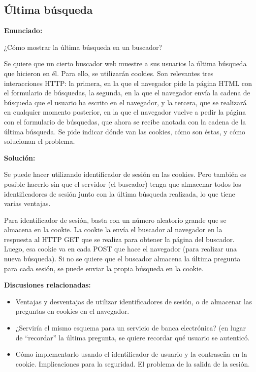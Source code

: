 \subsection{Última búsqueda}
\label{subsec:ultima-busqueda}

\textbf{Enunciado:}

¿Cómo mostrar la última búsqueda en un  buscador?

Se quiere que un cierto buscador web muestre a sus usuarios la última búsqueda que hicieron en él. Para ello, se utilizarán cookies. Son relevantes tres interacciones HTTP: la primera, en la que el navegador pide la página HTML con el formulario de búsquedas, la segunda, en la que el navegador envía la cadena de búsqueda que el usuario ha escrito en el navegador, y la tercera, que se realizará en cualquier momento posterior, en la que el navegador vuelve a pedir la página con el formulario de búsquedas, que ahora se recibe anotada con la cadena de la última búsqueda. Se pide indicar dónde van las cookies, cómo son éstas, y cómo solucionan el problema.

\textbf{Solución:}

Se puede hacer utilizando identificador de sesión en las cookies. Pero también es posible hacerlo sin que el servidor (el buscador) tenga que almacenar todos los identificadores de sesión  junto con la última búsqueda realizada, lo que tiene varias ventajas.

Para identificador de sesión, basta con un número aleatorio grande que se almacena en la cookie. La cookie la envía el buscador al navegador en la respuesta al HTTP GET que se realiza para obtener la página del buscador. Luego, esa cookie va en cada POST que hace el navegador (para realizar una nueva búsqueda). Si no se quiere que el buscador almacena la última pregunta para cada sesión, se puede enviar la propia búsqueda en la cookie.   

\textbf{Discusiones relacionadas:}

\begin{itemize}
\item Ventajas y desventajas de utilizar identificadores de sesión, o de almacenar las preguntas en cookies en el navegador.
\item ¿Serviría el mismo esquema para un servicio de banca electrónica? (en lugar de ``recordar'' la última pregunta, se quiere recordar qué usuario se autenticó.
\item Cómo implementarlo usando el identificador de usuario y la contraseña en la cookie. Implicaciones para la seguridad. El problema de la salida de la sesión.
\end{itemize}

